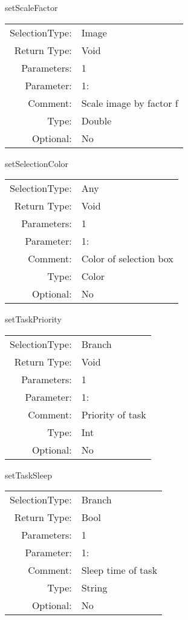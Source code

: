 \item setScaleFactor\\
\begin{tabular}{rl}
  SelectionType: & Image\\
    Return Type: & Void\\
     Parameters: & 1\\
   Parameter: &  1:\\
        Comment: & Scale image by factor f\\
           Type: & Double\\
       Optional: &  No\\
\end{tabular}

\item setSelectionColor\\
\begin{tabular}{rl}
  SelectionType: & Any\\
    Return Type: & Void\\
     Parameters: & 1\\
   Parameter: &  1:\\
        Comment: & Color of selection box\\
           Type: & Color\\
       Optional: &  No\\
\end{tabular}

\item setTaskPriority\\
\begin{tabular}{rl}
  SelectionType: & Branch\\
    Return Type: & Void\\
     Parameters: & 1\\
   Parameter: &  1:\\
        Comment: & Priority of task\\
           Type: & Int\\
       Optional: &  No\\
\end{tabular}

\item setTaskSleep\\
\begin{tabular}{rl}
  SelectionType: & Branch\\
    Return Type: & Bool\\
     Parameters: & 1\\
   Parameter: &  1:\\
        Comment: & Sleep time of task\\
           Type: & String\\
       Optional: &  No\\
\end{tabular}

